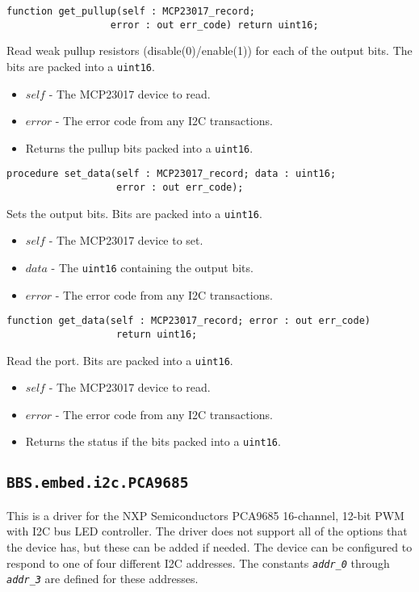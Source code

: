 \documentclass[10pt, openany]{book}
\newcommand{\package}[1]{\texttt{#1}}
\newcommand{\constant}[1]{\emph{\texttt{#1}}}
\newcommand{\datatype}[1]{\texttt{#1}}
\begin{document}
\begin{lstlisting}
function get_pullup(self : MCP23017_record;
                  error : out err_code) return uint16;
\end{lstlisting}
Read weak pullup resistors (disable(0)/enable(1)) for each of the output bits.  The bits are packed into a \datatype{uint16}.
\begin{itemize}
  \item $self$ - The MCP23017 device to read.
  \item $error$ - The error code from any I2C transactions.
  \item Returns the pullup bits packed into a \datatype{uint16}.
\end{itemize}

\begin{lstlisting}
procedure set_data(self : MCP23017_record; data : uint16;
                   error : out err_code);
\end{lstlisting}
Sets the output bits.  Bits are packed into a \datatype{uint16}.
\begin{itemize}
  \item $self$ - The MCP23017 device to set.
  \item $data$ - The \datatype{uint16} containing the output bits.
  \item $error$ - The error code from any I2C transactions.
\end{itemize}

\begin{lstlisting}
function get_data(self : MCP23017_record; error : out err_code)
                   return uint16;
\end{lstlisting}
Read the port.  Bits are packed into a \datatype{uint16}.
\begin{itemize}
  \item $self$ - The MCP23017 device to read.
  \item $error$ - The error code from any I2C transactions.
  \item Returns the status if the bits packed into a \datatype{uint16}.
\end{itemize}

\subsection{\package{BBS.embed.i2c.PCA9685}}
This is a driver for the NXP Semiconductors PCA9685 16-channel, 12-bit PWM with I2C bus LED controller\cite{PCA9685}.  The driver does not support all of the options that the device has, but these can be added if needed.  The device can be configured to respond to one of four different I2C addresses.  The constants \constant{addr\_0} through \constant{addr\_3} are defined for these addresses.
\end{document}

